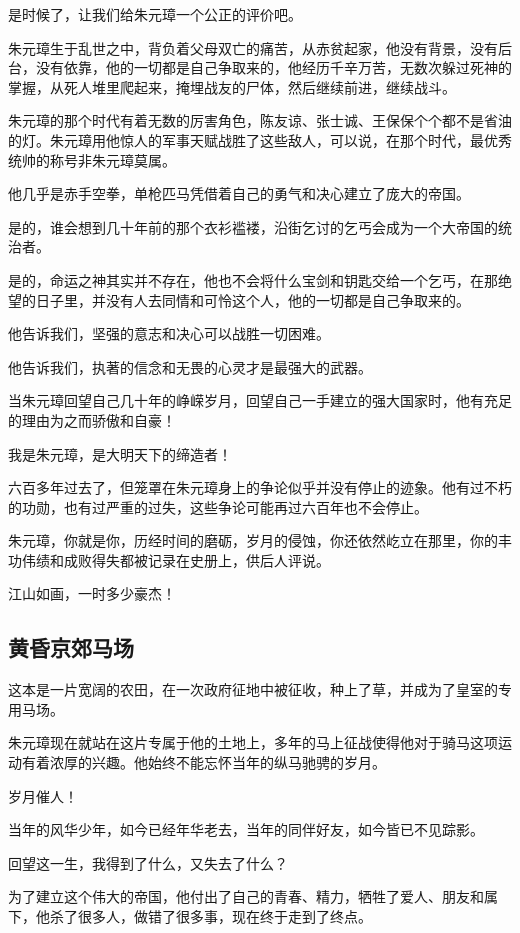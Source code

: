 \begin{multicols}{\theparacolNo}
		是时候了，让我们给朱元璋一个公正的评价吧。

		朱元璋生于乱世之中，背负着父母双亡的痛苦，从赤贫起家，他没有背景，没有后台，没有依靠，他的一切都是自己争取来的，他经历千辛万苦，无数次躲过死神的掌握，从死人堆里爬起来，掩埋战友的尸体，然后继续前进，继续战斗。

		朱元璋的那个时代有着无数的厉害角色，陈友谅、张士诚、王保保个个都不是省油的灯。朱元璋用他惊人的军事天赋战胜了这些敌人，可以说，在那个时代，最优秀统帅的称号非朱元璋莫属。

		他几乎是赤手空拳，单枪匹马凭借着自己的勇气和决心建立了庞大的帝国。

		是的，谁会想到几十年前的那个衣衫褴褛，沿街乞讨的乞丐会成为一个大帝国的统治者。

		是的，命运之神其实并不存在，他也不会将什么宝剑和钥匙交给一个乞丐，在那绝望的日子里，并没有人去同情和可怜这个人，他的一切都是自己争取来的。

		他告诉我们，坚强的意志和决心可以战胜一切困难。

		他告诉我们，执著的信念和无畏的心灵才是最强大的武器。

		当朱元璋回望自己几十年的峥嵘岁月，回望自己一手建立的强大国家时，他有充足的理由为之而骄傲和自豪！

		我是朱元璋，是大明天下的缔造者！

		六百多年过去了，但笼罩在朱元璋身上的争论似乎并没有停止的迹象。他有过不朽的功勋，也有过严重的过失，这些争论可能再过六百年也不会停止。

		朱元璋，你就是你，历经时间的磨砺，岁月的侵蚀，你还依然屹立在那里，你的丰功伟绩和成败得失都被记录在史册上，供后人评说。

		江山如画，一时多少豪杰！

		\subsection{黄昏京郊马场}
		这本是一片宽阔的农田，在一次政府征地中被征收，种上了草，并成为了皇室的专用马场。

		朱元璋现在就站在这片专属于他的土地上，多年的马上征战使得他对于骑马这项运动有着浓厚的兴趣。他始终不能忘怀当年的纵马驰骋的岁月。

		岁月催人！

		当年的风华少年，如今已经年华老去，当年的同伴好友，如今皆已不见踪影。

		回望这一生，我得到了什么，又失去了什么？

		为了建立这个伟大的帝国，他付出了自己的青春、精力，牺牲了爱人、朋友和属下，他杀了很多人，做错了很多事，现在终于走到了终点。


\end{multicols}
